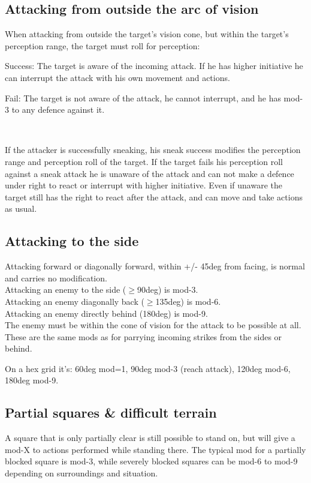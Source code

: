 \subsection*{Attacking from outside the arc of vision}
When attacking from outside the target's vision cone, but within the target's perception range, the target must roll for perception:

\noindent Success: The target is aware of the incoming attack. If he has higher initiative he can interrupt the attack with his own movement and actions.

\noindent Fail: The target is not aware of the attack, he cannot interrupt, and he has mod-3 to any defence against it.

\

If the attacker is successfully sneaking, his sneak success modifies the perception range and perception roll of the target. If the target fails his perception roll against a sneak attack he is unaware of the attack and can not make a defence under right to react or interrupt with higher initiative. Even if unaware the target still has the right to react after the attack, and can move and take actions as usual.


\subsection*{Attacking to the side}
Attacking forward or diagonally forward, within +/- 45deg from facing, is normal and carries no modification. \\
Attacking an enemy to the side ($\ge$90deg) is mod-3. \\
Attacking an enemy diagonally back ($\ge$135deg) is mod-6. \\
Attacking an enemy directly behind (180deg) is mod-9. \\
The enemy must be within the cone of vision for the attack to be possible at all. \\
These are the same mods as for parrying incoming strikes from the sides or behind.

On a hex grid it's: 60deg mod=1, 90deg mod-3 (reach attack), 120deg mod-6, 180deg mod-9.


\subsection*{Partial squares \& difficult terrain}
A square that is only partially clear is still possible to stand on, but will give a mod-X to actions performed while standing there. The typical mod for a partially blocked square is mod-3, while severely blocked squares can be mod-6 to mod-9 depending on surroundings and situation.

